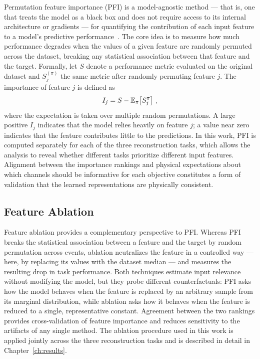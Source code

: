 Permutation feature importance (PFI) is a model-agnostic method --- that is, one that treats the model as a black box and does not require access to its internal architecture or gradients --- for quantifying the contribution of each input feature to a model's predictive performance~. The core idea is to measure how much performance degrades when the values of a given feature are randomly permuted across the dataset, breaking any statistical association between that feature and the target. Formally, let $S$ denote a performance metric evaluated on the original dataset and $S_j^{(\pi)}$ the same metric after randomly permuting feature $j$. The importance of feature $j$ is defined as
\begin{equation}
    I_j = S - \mathbb{E}_\pi \qty[S_j^\pi] \ ,
\end{equation}
where the expectation is taken over multiple random permutations. A large positive $I_j$ indicates that the model relies heavily on feature $j$; a value near zero indicates that the feature contributes little to the predictions. In this work, PFI is computed separately for each of the three reconstruction tasks, which allows the analysis to reveal whether different tasks prioritize different input features. Alignment between the importance rankings and physical expectations about which channels should be informative for each objective constitutes a form of validation that the learned representations are physically consistent.

\subsection{Feature Ablation}

Feature ablation provides a complementary perspective to PFI. Whereas PFI breaks the statistical association between a feature and the target by random permutation across events, ablation neutralizes the feature in a controlled way --- here, by replacing its values with the dataset median --- and measures the resulting drop in task performance. Both techniques estimate input relevance without modifying the model, but they probe different counterfactuals: PFI asks how the model behaves when the feature is replaced by an arbitrary sample from its marginal distribution, while ablation asks how it behaves when the feature is reduced to a single, representative constant. Agreement between the two rankings provides cross-validation of feature importance and reduces sensitivity to the artifacts of any single method. The ablation procedure used in this work is applied jointly across the three reconstruction tasks and is described in detail in Chapter~\ref{ch:results}.

